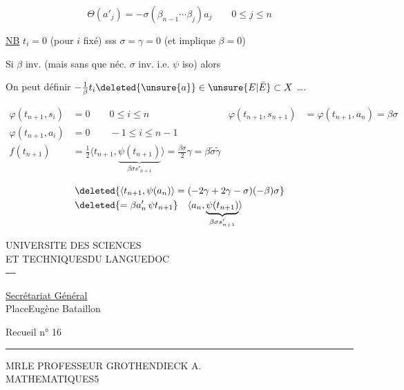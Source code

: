 \[
\Theta(a'_j)=-\sigma(\beta_{n-1}\cdots\beta_j)a_j\qquad0\le j\le n
\]

\uline{NB} $t_i=0$ (pour $i$ fixé) sss $\sigma=\gamma=0$ (et  implique $\beta=0$)

Si $\beta$ inv. (mais sans que néc. $\sigma$ inv. i.e. $\psi$ iso) alors

On peut définir $-\frac{1}{\beta}t_i\deleted{\unsure{a}}\in\unsure{E|\bar E}\subset X$ \ldots.

\[
\begin{aligned}
\varphi(t_{n+1},s_i)&=0\qquad0\le i\le n&\varphi(t_{n+1},s_{n+1})&=\varphi(t_{n+1},a_n)=\beta\sigma\\
\varphi(t_{n+1},a_i)&=0\qquad-1\le i\le n-1\\
f(t_{n+1})&=\tfrac12\langle t_{n+1},\underbrace{\psi(t_{n+1})}_{\beta\sigma s'_{n+1}}\rangle=\frac{\beta\sigma}{2}\gamma=\beta\widetilde{\sigma}\widetilde{\gamma}
\end{aligned}
\]

\[
\begin{aligned}
&\deleted{\langle t_{n+1},\psi(a_n)\rangle=(-2\gamma+2\gamma-\sigma)(-\beta)\sigma}\\
&\deleted{=\beta a'_n\,\psi t_{n+1}}\quad\langle a_n,\underbrace{\psi(t_{n+1})}_{\beta\sigma s'_{n+1}}\rangle
\end{aligned}
\]


UNIVERSITE DES SCIENCES\\
ET TECHNIQUES\quad DU LANGUEDOC\\
\texttt{-----}

\uline{Secrétariat Général}\\
Place\quad Eugène Bataillon\\


Recueil n° 16

\rule{1em}{.35pt}

MR\quad LE PROFESSEUR GROTHENDIECK A.\\
MATHEMATIQUES\hfill 5


